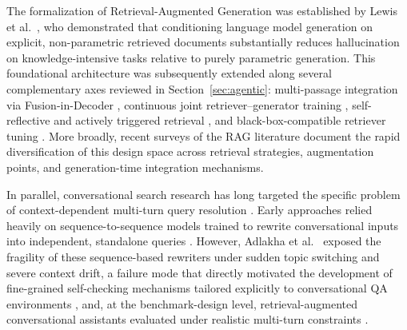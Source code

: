 The formalization of Retrieval-Augmented Generation was established by Lewis et al.\ \citep{lewis2020retrieval}, who demonstrated that conditioning language model generation on explicit, non-parametric retrieved documents substantially reduces hallucination on knowledge-intensive tasks relative to purely parametric generation. This foundational architecture was subsequently extended along several complementary axes reviewed in Section~\ref{sec:agentic}: multi-passage integration via Fusion-in-Decoder \citep{izacard2021leveraging}, continuous joint retriever--generator training \citep{izacard2023atlas}, self-reflective and actively triggered retrieval \citep{asai2024selfrag, jiang2023active}, and black-box-compatible retriever tuning \citep{shi2024replug}. More broadly, recent surveys of the RAG literature \citep{gao2024retrievalaugmented} document the rapid diversification of this design space across retrieval strategies, augmentation points, and generation-time integration mechanisms.

In parallel, conversational search research has long targeted the specific problem of context-dependent multi-turn query resolution \citep{dalton2020trec}. Early approaches relied heavily on sequence-to-sequence models trained to rewrite conversational inputs into independent, standalone queries \citep{vakulenko2021question, anantha2021open}. However, Adlakha et al.\ \citep{adlakha2022topiocqa} exposed the fragility of these sequence-based rewriters under sudden topic switching and severe context drift, a failure mode that directly motivated the development of fine-grained self-checking mechanisms tailored explicitly to conversational QA environments \citep{ye2024boosting}, and, at the benchmark-design level, retrieval-augmented conversational assistants evaluated under realistic multi-turn constraints \citep{aliannejadi2024trec, kuo2025radbench}.

